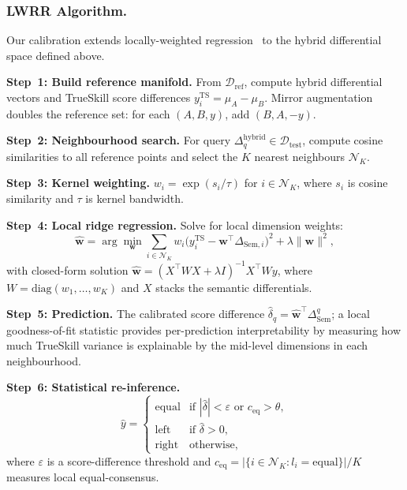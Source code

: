 \documentclass[runningheads]{llncs}
\begin{document}
\subsubsection{LWRR Algorithm.}
Our calibration extends locally-weighted regression~\cite{cleveland1979robust,atkeson1997locally,ruppert1994multivariate} to the hybrid differential space defined above.

\noindent\textbf{Step~1: Build reference manifold.}
From $\mathcal{D}_{\mathrm{ref}}$, compute hybrid differential vectors and TrueSkill score differences $y_i^{\text{TS}}{=}\mu_A{-}\mu_B$.
Mirror augmentation doubles the reference set: for each $(A,B,y)$, add $(B,A,-y)$.

\noindent\textbf{Step~2: Neighbourhood search.}
For query $\Delta_q^{\mathrm{hybrid}} \in \mathcal{D}_{\mathrm{test}}$, compute cosine similarities to all reference points and select the $K$ nearest neighbours $\mathcal{N}_K$.

\noindent\textbf{Step~3: Kernel weighting.}
$w_i=\exp(s_i/\tau)$ for $i\in\mathcal{N}_K$, where $s_i$ is cosine similarity and $\tau$ is kernel bandwidth.

\noindent\textbf{Step~4: Local ridge regression.}
Solve for local dimension weights:
\begin{equation}
\hat{\mathbf{w}} = \arg\min_{\mathbf{w}} \sum_{i\in\mathcal{N}_K} w_i\bigl(y_i^{\text{TS}}-\mathbf{w}^{\!\top}\Delta_{\text{Sem},i}\bigr)^{2} + \lambda\|\mathbf{w}\|^{2},
\label{eq:lwrr}
\end{equation}
with closed-form solution $\hat{\mathbf{w}}=(X^{\!\top}WX+\lambda I)^{-1}X^{\!\top}Wy$, where $W{=}\mathrm{diag}(w_1,\ldots,w_K)$ and $X$ stacks the semantic differentials.

\noindent\textbf{Step~5: Prediction.}
The calibrated score difference $\hat{\delta}_q = \hat{\mathbf{w}}^{\!\top}\Delta_{\text{Sem}}^{q}$; a local goodness-of-fit statistic provides per-prediction interpretability by measuring how much TrueSkill variance is explainable by the mid-level dimensions in each neighbourhood.

\noindent\textbf{Step~6: Statistical re-inference.}
\begin{equation}
\hat{y} =
\begin{cases}
\text{equal} & \text{if } |\hat{\delta}|<\varepsilon \text{ or } c_{\mathrm{eq}}>\theta, \\
\text{left}  & \text{if } \hat{\delta}>0, \\
\text{right} & \text{otherwise},
\end{cases}
\label{eq:reinfer}
\end{equation}
where $\varepsilon$ is a score-difference threshold and $c_{\mathrm{eq}}{=}|\{i\in\mathcal{N}_K: l_i{=}\text{equal}\}|/K$ measures local equal-consensus.
\end{document}
